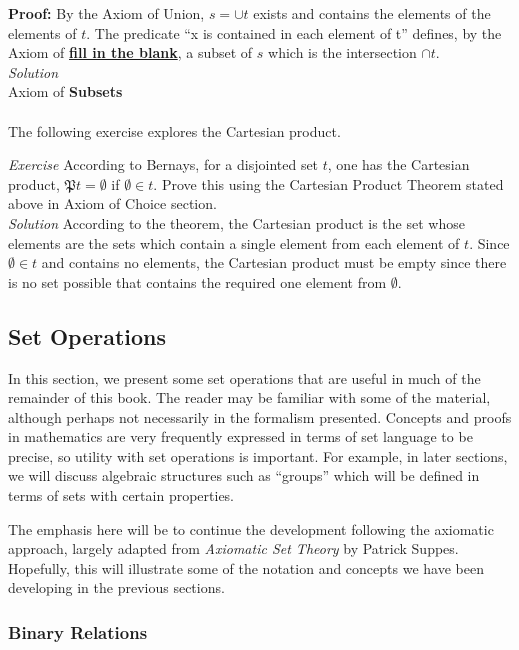 \textbf{Proof:}  By the Axiom of Union, $s=\cup t$ exists and contains the elements of the elements of $t$.  The predicate ``x is contained in each element of t'' defines, by the Axiom of \textbf{\underline{fill in the blank}}, a subset of $s$ which is the intersection $\cap t$.\\


\textit{Solution}\\
Axiom of \textbf{Subsets}\\\\

The following exercise explores the Cartesian product.

\textit{Exercise}  According to Bernays, for a disjointed set $t$, one has the Cartesian product, $\mathfrak{P}t=\emptyset$ if $\emptyset \in t.$  Prove this using the Cartesian Product Theorem stated above in Axiom of Choice section.\\

\textit{Solution}
According to the theorem, the Cartesian product is the set whose elements are the sets which contain a single element from each element of $t$.  Since $\emptyset \in t$ and contains no elements, the Cartesian product must be empty since there is no set possible that contains the required one element from $\emptyset$.\\

\subsection{Set Operations}
In this section, we present some set operations that are useful in much of the remainder of this book.  The reader may be familiar with some of the material, although perhaps not necessarily in the formalism presented. Concepts and proofs in mathematics are very frequently expressed in terms of set language to be precise, so utility with set operations is important.  For example, in later sections, we will discuss algebraic structures such as ``groups'' which will be defined in terms of sets with certain properties.  

The emphasis here will be to continue the development following the axiomatic approach, largely adapted from \textit{Axiomatic Set Theory} by Patrick Suppes.  Hopefully, this will illustrate some of the notation and concepts we have been developing in the previous sections.\\

\subsubsection{Binary Relations}

